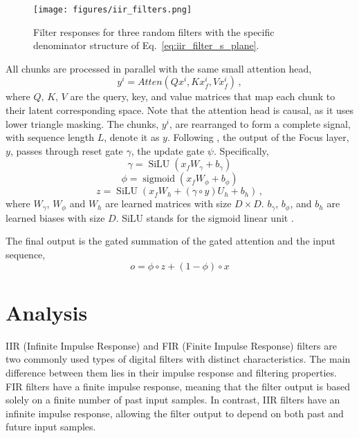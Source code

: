 \documentclass[11pt]{article}
\begin{document}
\begin{figure}
    \centering
    \texttt{[image: figures/iir\_filters.png]}
    \caption{Filter responses for three random filters with the specific denominator structure of Eq.~\ref{eq:iir_filter_s_plane}.}
    \label{fig:random_iir}
\end{figure}

All chunks are processed in parallel with the same small attention head,
\begin{equation}
    y^i = Atten(Qx^i, Kx_f^i, Vx_f^i)\,,
\end{equation}
where $Q,\,K,\,V$ are the query, key, and value matrices that map each chunk to their latent corresponding space.
Note that the attention head is causal, as it uses lower triangle masking.
The chunks, $y^i$, are rearranged to form a complete signal, with sequence length $L$, denote it as $y$.
Following \cite{ma2022mega}, the output of the Focus layer, $y$, passes through reset gate $\gamma$, the update gate $\psi$. Specifically,
\begin{equation}
    \gamma = \operatorname{SiLU}(x_fW_{\gamma} +b_{\gamma})
\end{equation}
\begin{equation}
    \phi = \operatorname{sigmoid}(x_fW_{\phi} +b_{\phi})
\end{equation}
\begin{equation}
    z = \operatorname{SiLU}(x_fW_{h} + (\gamma\circ y)U_h + b_h)\,,
\end{equation}
where $W_{\gamma}$, $W_{\phi}$ and $W_{h}$ are learned matrices with size $D\times D$. $b_{\gamma}$, $b_{\phi}$, and $b_{h}$ are learned biases with size $D$. SiLU stands for the 
sigmoid linear unit \cite{elfwing2018sigmoid}.

The final output is the gated summation of the gated attention and the input sequence,
\begin{equation}
    o = \phi \circ z + (1-\phi) \circ x
\end{equation}

\section{Analysis}
\label{seq:analysis}
{}
IIR (Infinite Impulse Response) and FIR (Finite Impulse Response) filters are two commonly used types of digital filters with distinct characteristics. The main difference between them lies in their impulse response and filtering properties. FIR filters have a finite impulse response, meaning that the filter output is based solely on a finite number of past input samples. In contrast, IIR filters have an infinite impulse response, allowing the filter output to depend on both past and future input samples.
\end{document}
